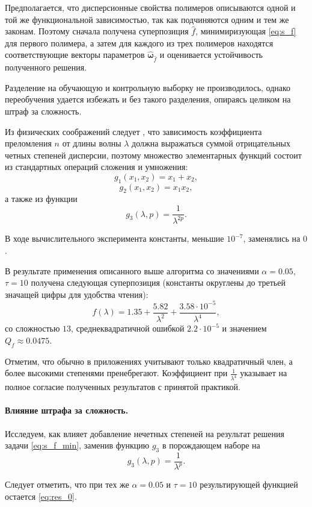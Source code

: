 \documentclass[12pt,a4paper]{article}
\theoremstyle{definition}
\begin{document}
Предполагается, что дисперсионные свойства полимеров описываются одной и той же функциональной зависимостью, так
как подчиняются одним и тем же законам. Поэтому сначала получена суперпозиция $\hat{f}$,
минимиризующая \eqref{eq:s_f} для первого полимера, а затем для каждого
из трех полимеров находятся соответствующие векторы параметров
$\hat{\boldsymbol{\omega}}_{\hat{f}}$ и оценивается устойчивость полученного решения.

Разделение на обучающую и контрольную выборку не производилось, однако переобучения
удается избежать и без такого разделения, опираясь целиком на штраф за сложность.

Из физических соображений следует \cite{Serova11}, что зависимость коэффициента
преломления $n$ от длины волны $\lambda$ должна выражаться суммой отрицательных
четных степеней дисперсии, поэтому множество элементарных функций состоит из
стандартных операций сложения и умножения:
\[
  g_1(x_1, x_2) = x_1 + x_2,
\]
\[
  g_2(x_1, x_2) = x_1 x_2,
\]
а также из функции
\[
  g_3(\lambda, p) = \frac{1}{\lambda^{2p}}.
\]

В ходе вычислительного эксперимента константы, меньшие $10^{-7}$,
заменялись на $0$.

В результате применения описанного выше алгоритма со значениями
$\alpha = 0.05$, $\tau = 10$ получена следующая суперпозиция
(константы округлены до третьей значащей цифры для удобства чтения):
\begin{equation}
  f(\lambda) = 1.35 + \frac{5.82}{\lambda^2} + \frac{3.58 \cdot 10^{-5}}{\lambda^4},
  \label{eq:res_0}
\end{equation}
со сложностью $13$, среднеквадратичной ошибкой $2.2 \cdot 10^{-5}$ и значением $Q_f \approx 0.0475$.

Отметим, что обычно в приложениях учитывают только квадратичный член, а более
высокими степенями пренебрегают. Коэффициент при $\frac{1}{\lambda^4}$ указывает
на полное согласие полученных результатов с принятой практикой.

\paragraph{Влияние штрафа за сложность.}

Исследуем, как влияет добавление нечетных степеней на результат решения задачи \eqref{eq:s_f_min},
заменив функцию $g_3$ в порождающем наборе на
\[
  g_3(\lambda, p) = \frac{1}{\lambda^p}.
\]

Следует отметить, что при тех же $\alpha = 0.05$ и $\tau = 10$ результирующей функцией остается
\eqref{eq:res_0}.
\end{document}
